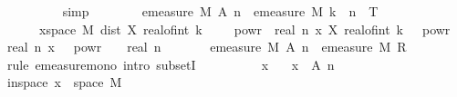 \begin{isabellebody}
\ \ \ \ \ \ \ \ \isamarkupfalse%
\ simp\isanewline
\ \ \ \ \ \ \isamarkupfalse%
\ {\isachardoublequoteopen}emeasure\ {\isacharquery}{\kern0pt}M\ {\isacharparenleft}{\kern0pt}A\ n{\isacharparenright}{\kern0pt}\ {\isasymle}\ emeasure\ {\isacharquery}{\kern0pt}M\ {\isacharparenleft}{\kern0pt}{\isasymUnion}k\ {\isasymin}\ {\isacharbraceleft}{\kern0pt}{}{\isachardot}{\kern0pt}{\isachardot}{\kern0pt}{\isasymlfloor}{}{\isacharcircum}{\kern0pt}n\ {\isacharasterisk}{\kern0pt}\ T{\isasymrfloor}{\isacharbraceright}{\kern0pt}{\isachardot}{\kern0pt}\isanewline
\ \ \ \ \ \ {\isacharbraceleft}{\kern0pt}x{\isasymin}space\ {\isacharquery}{\kern0pt}M{\isachardot}{\kern0pt}\ dist\ {\isacharparenleft}{\kern0pt}X\ {\isacharparenleft}{\kern0pt}real{\isacharunderscore}{\kern0pt}of{\isacharunderscore}{\kern0pt}int\ {\isacharparenleft}{\kern0pt}k\ {\isacharminus}{\kern0pt}\ {}{\isacharparenright}{\kern0pt}\ {\isacharasterisk}{\kern0pt}\ {}\ powr\ {\isacharminus}{\kern0pt}\ real\ n{\isacharparenright}{\kern0pt}\ x{\isacharparenright}{\kern0pt}\ {\isacharparenleft}{\kern0pt}X\ {\isacharparenleft}{\kern0pt}real{\isacharunderscore}{\kern0pt}of{\isacharunderscore}{\kern0pt}int\ k\ {\isacharasterisk}{\kern0pt}\ {}\ powr\ {\isacharminus}{\kern0pt}\ real\ n{\isacharparenright}{\kern0pt}\ x{\isacharparenright}{\kern0pt}\ {\isasymge}\ {}\ powr\ {\isacharparenleft}{\kern0pt}{\isacharminus}{\kern0pt}\ {\isasymgamma}\ {\isacharasterisk}{\kern0pt}\ real\ n{\isacharparenright}{\kern0pt}{\isacharbraceright}{\kern0pt}{\isacharparenright}{\kern0pt}{\isachardoublequoteclose}\isanewline
\ \ \ \ \ \ {\isacharparenleft}{\kern0pt}\ {\isachardoublequoteopen}emeasure\ {\isacharquery}{\kern0pt}M\ {\isacharparenleft}{\kern0pt}A\ n{\isacharparenright}{\kern0pt}\ {\isasymle}\ emeasure\ {\isacharquery}{\kern0pt}M\ {\isacharquery}{\kern0pt}R{\isachardoublequoteclose}{\isacharparenright}{\kern0pt}\isanewline
\ \ \ \ \ \ \isamarkupfalse%
\ {\isacharparenleft}{\kern0pt}rule\ emeasure{\isacharunderscore}{\kern0pt}mono{\isacharcomma}{\kern0pt}\ intro\ subsetI{\isacharparenright}{\kern0pt}\isanewline
\ \ \ \ \ \ \ \ \isamarkupfalse%
\ x\ \isamarkupfalse%
\ {\isacharasterisk}{\kern0pt}{\isacharcolon}{\kern0pt}\ {\isachardoublequoteopen}x\ {\isasymin}\ A\ n{\isachardoublequoteclose}\isanewline
\ \ \ \ \ \ \ \ \isamarkupfalse%
\ {\isacharasterisk}{\kern0pt}\ \isamarkupfalse%
\ in{\isacharunderscore}{\kern0pt}space{\isacharcolon}{\kern0pt}\ {\isachardoublequoteopen}x\ {\isasymin}\ space\ {\isacharquery}{\kern0pt}M{\isachardoublequoteclose}\isanewline

\end{isabellebody}
